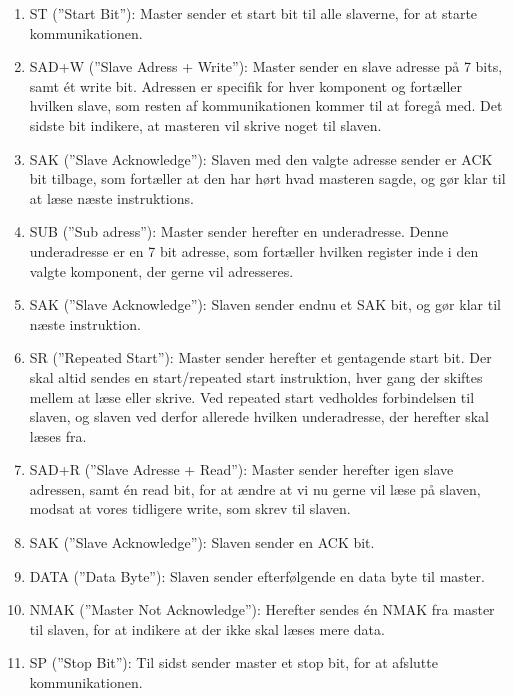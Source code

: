 \begin{enumerate}
\item ST (”Start Bit”): Master sender et start bit til alle slaverne, for at starte kommunikationen.
\item SAD+W (”Slave Adress + Write”): Master sender en slave adresse på 7 bits, samt ét write bit. Adressen er specifik for hver komponent og fortæller hvilken slave, som resten af kommunikationen kommer til at foregå med. Det sidste bit indikere, at masteren vil skrive noget til slaven.
\item SAK (”Slave Acknowledge”): Slaven med den valgte adresse sender er ACK bit tilbage, som fortæller at den har hørt hvad masteren sagde, og gør klar til at læse næste instruktions.
\item SUB (”Sub adress”): Master sender herefter en underadresse. Denne underadresse er en 7 bit adresse, som fortæller hvilken register inde i den valgte komponent, der gerne vil adresseres.
\item SAK (”Slave Acknowledge”): Slaven sender endnu et SAK bit, og gør klar til næste instruktion.
\item SR (”Repeated Start”): Master sender herefter et gentagende start bit. Der skal altid sendes en start/repeated start instruktion, hver gang der skiftes mellem at læse eller skrive. Ved repeated start vedholdes forbindelsen til slaven, og slaven ved derfor allerede hvilken underadresse, der herefter skal læses fra.
\item SAD+R (”Slave Adresse + Read”): Master sender herefter igen slave adressen, samt én read bit, for at ændre at vi nu gerne vil læse på slaven, modsat at vores tidligere write, som skrev til slaven.
\item SAK (”Slave Acknowledge”):  Slaven sender en ACK bit.
\item DATA (”Data Byte”): Slaven sender efterfølgende en data byte til master.
\item NMAK (”Master Not Acknowledge”): Herefter sendes én NMAK fra master til slaven, for at indikere at der ikke skal læses mere data.
\item SP (”Stop Bit”): Til sidst sender master et stop bit, for at afslutte kommunikationen.
\end{enumerate}
